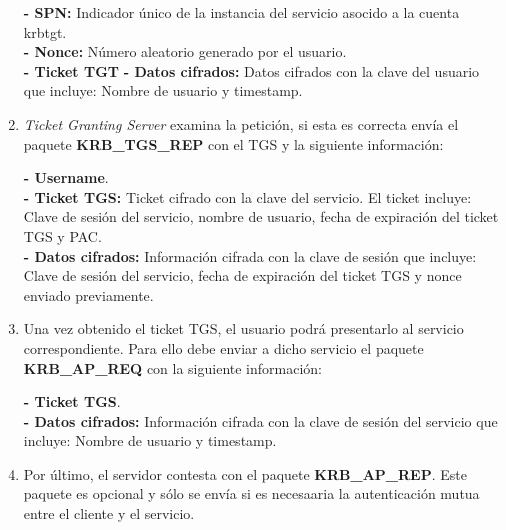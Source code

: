 \begin{enumerate}
\textbf{- SPN:} Indicador único de la instancia del servicio asocido a la cuenta krbtgt. \\
\textbf{- Nonce:} Número aleatorio generado por el usuario. \\
\textbf{- Ticket TGT}
\textbf{- Datos cifrados:} Datos cifrados con la clave del usuario que incluye: Nombre de usuario y timestamp. \\

\item {\it Ticket Granting Server} examina la petición, si esta es correcta envía el paquete \textbf{KRB\_TGS\_REP} con el TGS y la siguiente información:

\textbf{- Username}. \\
\textbf{- Ticket TGS:} Ticket cifrado con la clave del servicio. El ticket incluye: Clave de sesión del servicio, nombre de usuario, fecha de expiración del ticket TGS y PAC. \\
\textbf{- Datos cifrados:} Información cifrada con la clave de sesión que incluye: Clave de sesión del servicio, fecha de expiración del ticket TGS y nonce enviado previamente.

\item Una vez obtenido el ticket TGS, el usuario podrá presentarlo al servicio correspondiente. Para ello debe enviar a dicho servicio el paquete \textbf{KRB\_AP\_REQ} con la siguiente información: 

\textbf{- Ticket TGS}.\\
\textbf{- Datos cifrados:} Información cifrada con la clave de sesión del servicio que incluye: Nombre de usuario y timestamp. \\

\item Por último, el servidor contesta con el paquete \textbf{KRB\_AP\_REP}. Este paquete es opcional y sólo se envía si es necesaaria la au\-ten\-ti\-ca\-ción mutua entre el cliente y el servicio. 

\end{enumerate}

